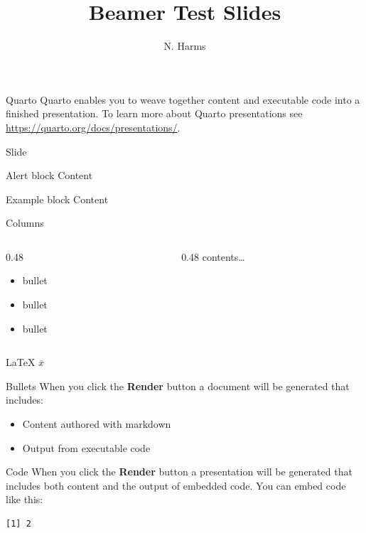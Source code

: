 \documentclass[
  ignorenonframetext,
]{beamer}
\title{Beamer Test Slides}
\author{N. Harms}
\date{}
\providecommand{\tightlist}{%
  \setlength{\itemsep}{0pt}\setlength{\parskip}{0pt}}\usepackage{longtable,booktabs,array}
\begin{document}
\frame{\titlepage}


\begin{frame}{Quarto}
\label{quarto}
Quarto enables you to weave together content and executable code into a
finished presentation. To learn more about Quarto presentations see
\url{https://quarto.org/docs/presentations/}.
\end{frame}

\begin{frame}{Slide}
\label{slide}
\begin{alertblock}{Alert block}
\label{alert-block}
Content
\end{alertblock}

\begin{exampleblock}{Example block}
\label{example-block}
Content
\end{exampleblock}
\end{frame}

\begin{frame}{Columns}
\label{columns}
\begin{columns}[c]
\begin{column}[c]{0.48\textwidth}
\begin{itemize}
\tightlist
\item
  bullet
\item
  bullet
\item
  bullet
\end{itemize}
\end{column}

\begin{column}[b]{0.48\textwidth}
contents\ldots{}
\end{column}
\end{columns}
\end{frame}

\begin{frame}{LaTeX}
\label{latex}
\(\overline{x}\)
\end{frame}

\begin{frame}{Bullets}
\label{bullets}
When you click the \textbf{Render} button a document will be generated
that includes:

\begin{itemize}
\tightlist
\item
  Content authored with markdown
\item
  Output from executable code
\end{itemize}
\end{frame}

\begin{frame}[fragile]{Code}
\label{code}
When you click the \textbf{Render} button a presentation will be
generated that includes both content and the output of embedded code.
You can embed code like this:

\begin{verbatim}
[1] 2
\end{verbatim}
\end{frame}
\end{document}

